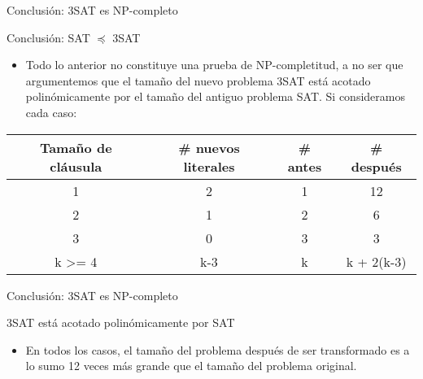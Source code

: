 \documentclass[10pt, mathserif, profesionalfont]{beamer}
\begin{document}
\begin{frame}{Conclusión: 3SAT es NP-completo}
\begin{block}{Conclusión: SAT $\preceq$ 3SAT}   
\begin{itemize}
\item{Todo lo anterior no constituye una prueba de NP-completitud, a no ser que argumentemos que el tamaño del nuevo problema 3SAT está acotado polinómicamente por el tamaño del antiguo problema SAT. \newline \newline Si consideramos cada caso:}
\end{itemize}
\begin{table}[]
\centering

\begin{tabular}{cccc}
\hline
\multicolumn{1}{|c|}{\textbf{Tamaño de cláusula}} & \multicolumn{1}{c|}{\textbf{\# nuevos literales}} & \multicolumn{1}{c|}{\textbf{\# antes}} & \multicolumn{1}{c|}{\textbf{\# después}} \\ \hline
1                                                 & 2                                                 & 1                                      & 12                                       \\
2                                                 & 1                                                 & 2                                      & 6                                        \\
3                                                 & 0                                                 & 3                                      & 3                                        \\
k \textgreater= 4                                 & k-3                                               & k                                      & k + 2(k-3)                              
\end{tabular}
\end{table}
\end{block}

\end{frame}

\begin{frame}{Conclusión: 3SAT es NP-completo}
\begin{block}{3SAT está acotado polinómicamente por SAT}
\begin{itemize}
\item En todos los casos, el tamaño del problema después de ser transformado es a lo sumo 12 veces más grande que el tamaño del problema original.
\end{itemize}
\end{block}

\end{frame}
\end{document}
